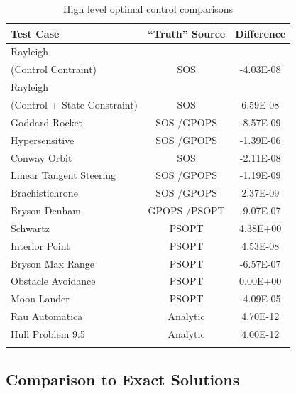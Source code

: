\documentclass[ISTS  ]{tjsass} %
\newcommand{\bhline}[1]{\noalign{\hrule height #1}}
\begin{document}
\begin{table}
	\centering
	\caption{High level optimal control comparisons}
	\label{table:high_level_comparison2}	\begin{tabularx}{\columnwidth}{Xcc}\bhline{.8pt}
        \textbf{Test Case}                    & \textbf{``Truth'' Source} & \textbf{Difference}\\\hline
        Rayleigh \\ (Control Contraint)          & SOS                       & -4.03E-08\\
        Rayleigh \\ (Control + State Constraint) & SOS                       & 6.59E-08\\
        Goddard Rocket                        & SOS /GPOPS                & -8.57E-09\\
        Hypersensitive                        & SOS /GPOPS                & -1.39E-06\\
        Conway Orbit                          & SOS                       & -2.11E-08\\
        Linear Tangent Steering               & SOS /GPOPS                & -1.19E-09\\
        Brachistichrone                       & SOS /GPOPS                & 2.37E-09\\
        Bryson Denham                         & GPOPS /PSOPT              & -9.07E-07\\
        Schwartz                              & PSOPT                     & 4.38E+00\\
        Interior Point                        & PSOPT                     & 4.53E-08\\
        Bryson Max Range                      & PSOPT                     & -6.57E-07\\
        Obstacle Avoidance                    & PSOPT                     & 0.00E+00\\
        Moon Lander                           & PSOPT                     & -4.09E-05\\
        Rau Automatica                        & Analytic                  & 4.70E-12\\
        Hull Problem 9.5                      & Analytic                  & 4.00E-12\\\bhline{.8pt}
	\end{tabularx}
\end{table}

\subsection{Comparison to Exact Solutions}
\end{document}
